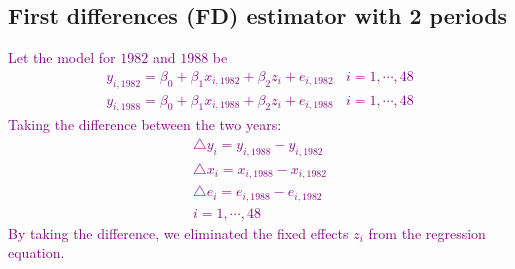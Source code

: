 \documentclass[a4paper,twoside,11pt]{article}
\begin{document}
\subsection{First differences (FD) estimator with 2 periods}
\textcolor{Purple}{
Let the model for $1982$ and $1988$ be 
\begin{equation*}
\begin{aligned}
y_{i,1982} = \beta_0 + \beta_1 x_{i,1982} + \beta_2 z_i + e_{i,1982} \ \ \ \ i=1,\cdots , 48 \\
y_{i,1988} = \beta_0 + \beta_1 x_{i,1988} + \beta_2 z_i + e_{i,1988} \ \ \ \ i=1,\cdots , 48
\end{aligned}
\end{equation*}
Taking the difference between the two years: \begin{equation*}
\begin{aligned}
\bigtriangleup y_i = y_{i,1988} - y_{i,1982} \\ 
\bigtriangleup x_i = x_{i,1988} - x_{i,1982} \\ 
\bigtriangleup e_i = e_{i,1988} - e_{i,1982}\\
i = 1, \cdots , 48
\end{aligned}
\end{equation*}
By taking the difference, we eliminated the fixed effects $z_i$ from the regression equation.
}
\newline
\newline
\end{document}
